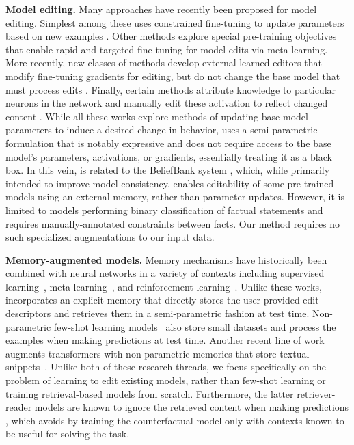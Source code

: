\documentclass{article}
\begin{document}
\textbf{Model editing.} Many approaches have recently been proposed for model editing. Simplest among these uses constrained fine-tuning to update parameters based on new examples \citep{sotoudeh2019correcting,zhu2020modifying}. Other methods explore special pre-training objectives that enable rapid and targeted  
fine-tuning for model edits \citep{Sinitsin2020Editable} via meta-learning. More recently, new classes of methods develop external learned editors that modify fine-tuning gradients for editing, but do not change the base model that must process edits \citep{Cao2021EditingFK,mitchell2021fast,hase2021language}. Finally, certain methods attribute knowledge to particular neurons in the network and manually edit these activation to reflect changed content \citep{dai2021knowledge,anon2021moving}. While all these works explore methods of updating base model parameters to induce a desired change in behavior, {\name} uses a semi-parametric formulation that is notably expressive and does not require access to the base model's parameters, activations, or gradients, essentially treating it as a black box. In this vein, {\name} is related to the BeliefBank system \citep{kassner-etal-2021-beliefbank}, which, while primarily intended to improve model consistency, enables editability of some pre-trained models using an external memory, rather than parameter updates. However, it is limited to models performing binary classification of factual statements and requires manually-annotated constraints between facts. Our method requires no such specialized augmentations to our input data.



\textbf{Memory-augmented models.} Memory mechanisms have historically been combined with neural networks in a variety of contexts including supervised learning~\citep{hochreiter1997long,graves2008novel,graves2014neural}, meta-learning~\citep{santoro2016memory, shan2020meta}, and reinforcement learning~\citep{oh2016control,pritzel2017neural}. Unlike these works, {\name} incorporates an explicit memory that directly stores the user-provided edit descriptors and retrieves them in a semi-parametric fashion at test time. Non-parametric few-shot learning models~\cite{koch2015siamese,vinyals2016matching,snell2017prototypical} also store small datasets and process the examples when making predictions at test time. Another recent line of work augments transformers with non-parametric memories that store textual snippets~\citep{Chen2017ReadingWT,Lee2019LatentRF,Khandelwal2020GeneralizationTM,karpukhin-etal-2020-dense}. Unlike both of these research threads, we focus specifically on the problem of learning to edit existing models, rather than few-shot learning or training retrieval-based models from scratch. Furthermore, the latter retriever-reader models are known to ignore the retrieved content when making predictions \citep{lewis2020retrieval,Paranjape2021HindsightPT}, which {\name} avoids by training the counterfactual model only with contexts known to be useful for solving the task.
\end{document}
